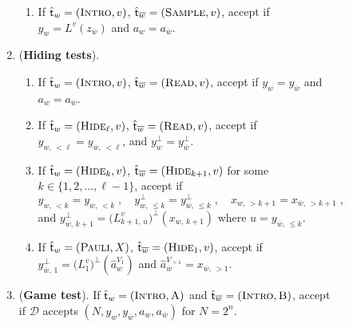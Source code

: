 \documentclass[11pt]{article}
\theoremstyle{definition}
\newcommand{\decider}{\mathcal{D}}
\newcommand{\labelstyle}[1]{\ensuremath{\textsc{#1}}\xspace}
\newcommand{\tvarstyle}[1]{\mathsf{#1}}
\newcommand{\tvar}{\ensuremath{\tvarstyle{t}}}
\newcommand{\trole}{\ensuremath{v}} %
\newcommand{\alice}{\labelstyle{A}}
\newcommand{\bob}{\labelstyle{B}}
\newcommand{\typestyle}[1]{\ensuremath{\textsc{#1}}\xspace}
\newcommand{\Pauli}{\typestyle{Pauli}}
\newcommand{\Sample}{\typestyle{Sample}}
\newcommand{\Read}{\typestyle{Read}}
\newcommand{\Hide}[1]{\typestyle{Hide}_{#1}}
\newcommand{\Introspect}{\typestyle{Intro}}
\newenvironment{gamespec}{
  \begin{mdframed}[style=figstyle]}{
  \end{mdframed}}
\begin{document}
\begin{figure}[!htbp]
\begin{gamespec}
\begin{enumerate}[itemsep=2pt, parsep=2pt]
\begin{enumerate}
      \item If $\hat{\tvar}_w = (\Introspect, \trole)$,
        $\hat{\tvar}_{\overline{w}} = (\Sample, \trole)$, accept if $y_{w} =
        L^\trole(z_{\overline{w}})$ and $a_w=a_{\overline{w}}$.
        \label{enu:sampling-intro}
      \end{enumerate}

    \item (\textbf{Hiding tests}).
      \label{enu:hiding}
      \begin{enumerate}

      \item If $\hat{\tvar}_w = (\Introspect, \trole)$,
        $\hat{\tvar}_{\overline{w}} = (\Read, \trole)$, accept if $y_{w} =
        y_{\overline{w}}$ and $a_w = a_{\overline{w}}$.
        \label{enu:hiding-intro}

      \item If $\hat{\tvar}_w = (\Hide{\ell}, \trole)$,
        $\hat{\tvar}_{\overline{w}} = (\Read, \trole)$, accept if $y_{w,\,
          <\ell} = y_{\overline{w},\, <\ell}$, and $y^{\perp}_w =
        y^{\perp}_{\overline{w}}$.
        \label{enu:hiding-read}
        
      \item \label{enu:hiding-same} If $\hat{\tvar}_w = (\Hide{k}, \trole)$,
        $\hat{\tvar}_{\overline{w}} = (\Hide{k+1}, \trole)$ for some $k \in \{ 1,
        2, \ldots, \ell-1 \}$, accept if
        \begin{equation*}
          y_{w,\, <k} = y_{\overline{w},\, <k}\;, \quad
          y^{\perp}_{w,\, \le k} = y^{\perp}_{\overline{w},\, \le k}\;, \quad
          x_{w,\, >k+1} = x_{\overline{w},\, >k+1}\;,
        \end{equation*}
        and $y^{\perp}_{\overline{w},\, k+1} = \big( L^{\trole}_{k+1,\, u} \big)^\perp
        (x_{w,\, k+1})$ where $u = y_{\overline{w},\, \le k}$.
      \item If $\hat{\tvar}_w = (\Pauli,X)$, $\hat{\tvar}_{\overline{w}} =
        (\Hide{1}, \trole)$, accept if $y^\perp_{\overline{w},\, 1} =
        \bigl( L^{\trole}_1 \bigr)^\perp (\hat{a}_w^{V_1})$ and $\hat{a}_w^{V_{> 1}} =
        x_{\overline{w},\, >1}$.
        \label{enu:hiding-pauli}
      \end{enumerate}

    \item (\textbf{Game test}).
      \label{enu:intro-game}
      If $\hat{\tvar}_w = (\Introspect, \alice)$ and $\hat{\tvar}_{\overline{w}}
      = (\Introspect, \bob)$, accept if $\decider$ accepts $(N, y_w,
      y_{\overline{w}}, a_w, a_{\overline{w}})$ for $N = 2^n$.


\end{enumerate}
\end{gamespec}
\end{figure}
\end{document}
